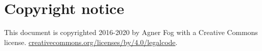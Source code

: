 \documentclass[forwardcom.tex]{subfiles}
\begin{document}
\RaggedRight

\chapter{Copyright notice}
This document is copyrighted 2016-2020 by Agner Fog with a Creative Commons license.
\href{https://creativecommons.org/licenses/by/4.0/legalcode}{creativecommons.org/licenses/by/4.0/legalcode}.
\end{document}
